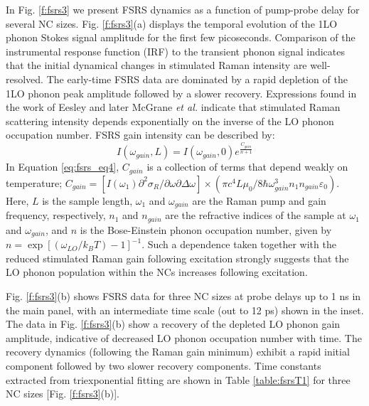 In Fig. \ref{f:fsrs3} we present FSRS dynamics as a function of pump-probe delay for several NC sizes. Fig. \ref{f:fsrs3}(a) displays the temporal evolution of the 1LO phonon Stokes signal amplitude for the first few picoseconds. Comparison of the instrumental response function (IRF) to the transient phonon signal indicates that the initial dynamical changes in stimulated Raman intensity are well-resolved. The early-time FSRS data are dominated by a rapid depletion of the 1LO phonon peak amplitude followed by a slower recovery. Expressions found in the work of Eesley and later McGrane \emph{et al.} \cite{Eesley1979507, PhysRevLett.107.043001} indicate that stimulated Raman scattering intensity depends exponentially on the inverse of the LO phonon occupation number. FSRS gain intensity can be described by:
\begin{equation} \label{eq:fsrs_eq4}
I\left(\omega_{gain}, L\right) = I\left(\omega_{gain}, 0\right)e^{\frac{C_{gain}}{n + 1}}
\end{equation}
In Equation \ref{eq:fsrs_eq4}, $C_{gain}$ is a collection of terms that depend weakly on temperature; $C_{gain} = \left[I(\omega_1)\partial^2\sigma_R/\partial\omega\partial\Delta\omega\right] \times \left(\pi c^4 L \mu_0/8\hbar\omega_{gain}^3 n_1 n_{gain} \varepsilon_0\right)$.  Here, $L$ is the sample length, $\omega_1$ and $\omega_{gain}$ are the Raman pump and gain frequency, respectively, $n_1$ and $n_{gain}$ are the refractive indices of the sample at $\omega_1$ and $\omega_{gain}$, and $n$ is the Bose-Einstein phonon occupation number, given by $n = \exp\left[\left(\omega_{LO}/k_BT\right) - 1\right]^{-1}$.  Such a dependence taken together with the reduced stimulated Raman gain following excitation strongly suggests that the LO phonon population within the NCs increases following excitation.  \par

Fig. \ref{f:fsrs3}(b)  shows FSRS data for three NC sizes at probe delays up to 1 ns in the main panel, with an intermediate time scale (out to 12 ps) shown in the inset. The data in Fig. \ref{f:fsrs3}(b) show a recovery of the depleted LO phonon gain amplitude, indicative of decreased LO phonon occupation number with time. The recovery dynamics (following the Raman gain minimum) exhibit a rapid initial component followed by two slower recovery components. Time constants extracted from triexponential fitting are shown in Table \ref{table:fsrsT1} for three NC sizes [Fig. \ref{f:fsrs3}(b)]. \par

